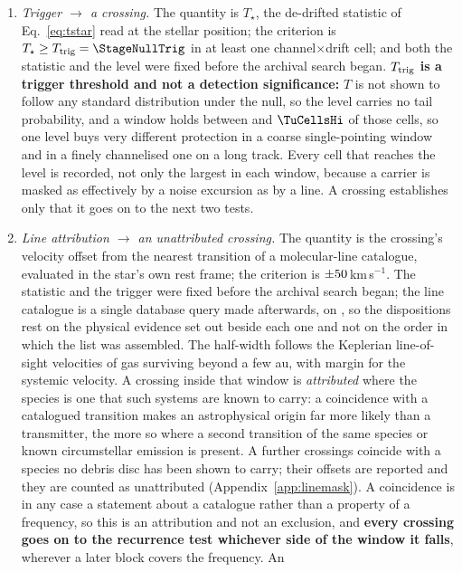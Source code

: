 \begin{enumerate}[label=(\roman*),leftmargin=1.9em,itemsep=3pt,topsep=3pt,parsep=0pt]
\item \emph{Trigger $\to$ a crossing.} The quantity is $T_\star$, the
de-drifted statistic of Eq.~\ref{eq:tstar} read at the stellar position; the
criterion is $T_\star\geq T_{\rm trig}=\StageNullTrig$ in at least one
channel$\times$drift cell; and both the statistic and the level were fixed
before the archival search began. \textbf{$T_{\rm trig}$ is a trigger
threshold and not a detection significance:} $T$ is not shown to follow any
standard distribution under the null, so the level carries no tail
probability, and a window holds between \TuCellsLo{} and $\TuCellsHi$ of
those cells, so one level buys very different protection in a coarse
single-pointing window and in a finely channelised one on a long track. Every
cell that reaches the level is recorded, not only the largest in each window,
because a carrier is masked as effectively by a noise excursion as by a line.
A crossing establishes only that it goes on to the next two tests.
\item \emph{Line attribution $\to$ an unattributed crossing.} The quantity
is the crossing's velocity offset from the nearest transition of a
molecular-line catalogue, evaluated in the star's own rest frame; the
criterion is $\pm50$\,km\,s$^{-1}$. The statistic and the trigger
were fixed before the archival search began; the line catalogue is a single
database query made afterwards, on \MkListDate, so the dispositions rest on
the physical evidence set out beside each one and not on the order in which
the list was assembled. The half-width follows the Keplerian line-of-sight
velocities of gas
surviving beyond a few au, with margin for the systemic velocity. A crossing
inside that window is \emph{attributed} where the species is one that such
systems are known to carry: a coincidence with a catalogued transition makes
an astrophysical origin far more likely than a transmitter, the more so
where a second transition of the same species or known circumstellar
emission is present. A further \MkNSODecideWord{} crossings coincide with a
species no debris disc has been shown to carry; their offsets are reported
and they are counted as unattributed (Appendix~\ref{app:linemask}).
A coincidence is in any case a statement about a catalogue rather than a
property of a frequency, so this is an attribution and not an exclusion, and
\textbf{every crossing goes on to the recurrence test whichever side of the
window it falls}, wherever a later block covers the frequency. An

\end{enumerate}
